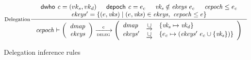 \documentclass[11pt,a4paper]{article}
\newcommand{\unionoverride}{\mathbin{\underrightarrow\cup}}
\newcommand{\var}[1]{\mathit{#1}}
\newcommand{\fun}[1]{\mathsf{#1}}
\newcommand{\trans}[2]{\xlongrightarrow[\textsc{#1}]{#2}}
\newcommand{\dwho}[1]{\fun{dwho}~\var{#1}}
\newcommand{\depoch}[1]{\fun{depoch}~\var{#1}}
\begin{document}
\begin{figure}
  \begin{equation}\label{eq:delegation}
    \inference[Delegation]
    {\dwho{c} = (vk_s, vk_d) & \depoch{c} = e_c & \var{vk_s} \notin \var{ekeys}~e_c & \var{cepoch} \leq e_c\\
      \var{ekeys'} = \{ (e, \var{vks})  \mid (e, \var{vks}) \in \var{ekeys},~  \var{cepoch} \leq e \}
    }
    {
      \var{cepoch} \vdash
      \left(
      \begin{array}{r}
        \var{dmap}\\
        \var{ekeys}
      \end{array}
      \right)
      \trans{deleg}{c}
      \left(
      \begin{array}{lcl}
        \var{dmap} & \unionoverride & \{\var{vk_s} \mapsto \var{vk_d}\}\\
        \var{ekeys'} & \unionoverride & \{e_c \mapsto (\var{ekeys'}~e_c \cup \{\var{vk_s}\})\}
      \end{array}
      \right)
    }
  \end{equation}
  \caption{Delegation inference rules}
  \label{fig:state-trans-delegation}
\end{figure}
\end{document}
